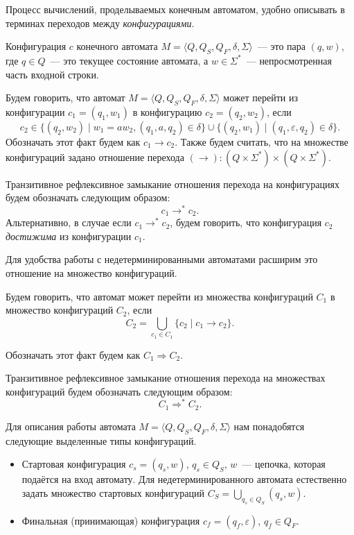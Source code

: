 Процесс вычислений, проделываемых конечным автоматом, удобно описывать в терминах переходов между \emph{конфигурациями}.

\begin{definition}[Конфигурация]
    Конфигурация $c$ конечного автомата $M = \langle Q, Q_S, Q_F, \delta, \Sigma \rangle$~--- это пара $(q, w)$, где $q\in Q$~--- это текущее состояние автомата, а $w \in \Sigma^*$~--- непросмотренная часть входной строки.
\end{definition}

\begin{definition}
    Будем говорить, что автомат $M = \langle Q, Q_S, Q_F, \delta, \Sigma \rangle$ может перейти из конфигурации $c_1 = (q_1, w_1)$ в конфигурацию $c_2 = (q_2, w_2)$, если
    \[c_2 \in \{(q_2,w_2) \mid w_1 = aw_2, (q_1,a, q_2) \in \delta\} \cup \{(q_2,w_1) \mid (q_1, \varepsilon, q_2) \in \delta\}.\]
    Обозначать этот факт будем как $c_1 \to c_2$.
    Также будем считать, что на множестве конфигураций задано отношение перехода $(\to):(Q \times \Sigma^*)\times(Q \times \Sigma^*)$.

\end{definition}

\begin{definition}
    Транзитивное рефлексивное замыкание отношения перехода на конфигурациях будем обозначать следующим образом: \[ c_1 \to^* c_2. \]
    Альтернативно, в случае если $c_1 \to^* c_2$, будем говорить, что конфигурация $c_2$ \textit{достижима} из конфигурации $c_1$.
\end{definition}

Для удобства работы с недетерминированными автоматами расширим это отношение на множество конфигураций.

\begin{definition}
Будем говорить, что автомат может перейти из множества конфигураций $C_1$ в множество конфигураций $C_2$, если
\[C_2 = \bigcup_{c_1 \in C_1} \{c_2 \mid c_1 \to c_2 \}.\]

Обозначать этот факт будем как  $C_1 \Rightarrow C_2 $.
\end{definition}

\begin{definition}
Транзитивное рефлексивное замыкание отношения перехода на множествах конфигураций будем обозначать следующим образом: \[ C_1 \Rightarrow^* C_2. \]
\end{definition}

Для описания работы автомата $M = \langle Q, Q_S, Q_F, \delta, \Sigma \rangle$ нам понадобятся следующие выделенные типы конфигураций.
\begin{itemize}
    \item Стартовая конфигурация $c_s = (q_s,w)$, $q_s \in Q_S$, $w$~--- цепочка, которая подаётся на вход автомату.
    Для недетерминированного автомата естественно задать множество стартовых конфигураций $C_S = \bigcup_{q_s \in Q_S} (q_s,w)$.
    \item Финальная (принимающая) конфигурация $c_f = (q_f,\varepsilon)$, $q_f \in Q_F$.
\end{itemize}

